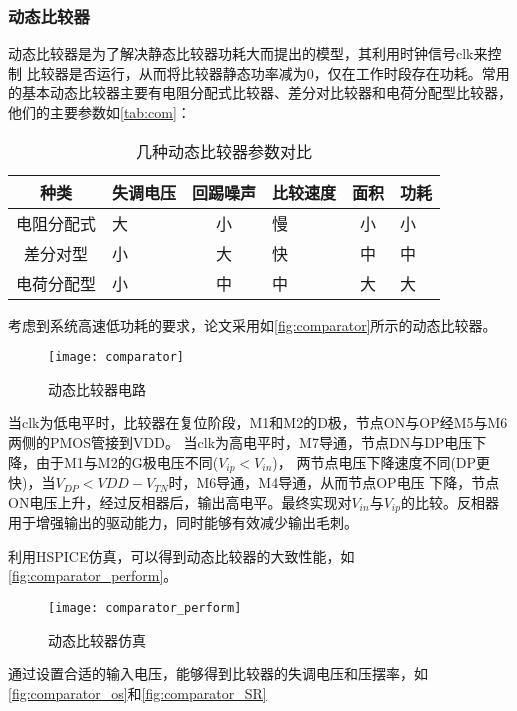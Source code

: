     \subsubsection{动态比较器}
    动态比较器是为了解决静态比较器功耗大而提出的模型，其利用时钟信号clk来控制
    比较器是否运行，从而将比较器静态功率减为0，仅在工作时段存在功耗。常用
    的基本动态比较器主要有电阻分配式比较器、差分对比较器和电荷分配型比较器，
    他们的主要参数如\autoref{tab:com}：
    \begin{table}[ht]
        \caption{\label{tab:com}几种动态比较器参数对比}
        \begin{tabularx}{\linewidth}{|c|X<{\centering}|c|X<{\centering}|c|X<{\centering}|}
            \hline
            种类 & 失调电压 & 回踢噪声 & 比较速度 & 面积 & 功耗\\ \hline
            电阻分配式 & 大 & 小 & 慢 & 小 & 小\\ \hline
            差分对型 & 小 & 大 & 快 & 中 & 中\\ \hline
            电荷分配型 & 小 & 中 & 中 & 大 & 大\\ \hline
        \end{tabularx}
    \end{table}
    \par 考虑到系统高速低功耗的要求，论文采用如\autoref{fig:comparator}所示的动态比较器。
    \begin{figure}[H]
        \centering
        \texttt{[image: comparator]}
        \caption{\label{fig:comparator}动态比较器电路}
    \end{figure}
    \par 当clk为低电平时，比较器在复位阶段，M1和M2的D极，节点ON与OP经M5与M6两侧的PMOS管接到VDD。
    当clk为高电平时，M7导通，节点DN与DP电压下降，由于M1与M2的G极电压不同($ V_{ip} < V_{in} $)，
    两节点电压下降速度不同(DP更快)，当$ V_{DP} < VDD - V_{TN} $时，M6导通，M4导通，从而节点OP电压
    下降，节点ON电压上升，经过反相器后，输出高电平。最终实现对$ V_{in} $与$ V_{ip} $的比较。反相器
    用于增强输出的驱动能力，同时能够有效减少输出毛刺。
    \par 利用HSPICE仿真，可以得到动态比较器的大致性能，如\autoref{fig:comparator_perform}。
    \begin{figure}[H]
        \centering
        \texttt{[image: comparator\_perform]}
        \caption{\label{fig:comparator_perform}动态比较器仿真}
    \end{figure}
    \par 通过设置合适的输入电压，能够得到比较器的失调电压和压摆率，如\autoref{fig:comparator_os}和\autoref{fig:comparator_SR}
